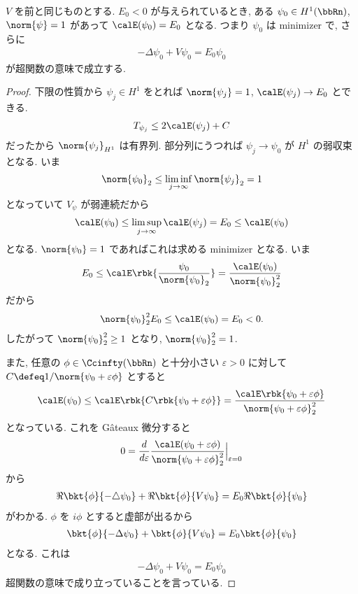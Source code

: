 \documentclass[openany, a4paper, oneside]{jsbook}
\begin{document}
\begin{thm}
$V$ を前と同じものとする.
$E_0 < 0$ が与えられているとき,
ある $\psi_0 \in H^1 (\bbRn)$, $\norm{\psi} = 1$ があって
$\calE (\psi_0) = E_0$ となる.
つまり $\psi_0$ は minimizer で, さらに
\begin{align}
 -\Delta \psi_0 + V \psi_0 = E_0 \psi_0
\end{align}
が超関数の意味で成立する.
\end{thm}
\begin{proof}
下限の性質から $\psi_j \in H^1$ をとれば
$\norm{\psi_j} = 1$, $\calE (\psi_j) \to E_0$ とできる.
\begin{align}
 T_{\psi_j}
 \leq
 2 \calE (\psi_j) + C
\end{align}
だったから $\norm{\psi_j}_{H^1}$ は有界列.
部分列にうつれば $\psi_j \to \psi_0$ が $H^1$ の弱収束となる.
いま
\begin{align}
 \norm{\psi_0}_2
 \leq
 \liminf_{j \to \infty} \norm{\psi_j}_2
 = 1
\end{align}
となっていて $V_{\psi}$ が弱連続だから
\begin{align}
 \calE (\psi_0)
 \leq
 \limsup_{j \to \infty} \calE (\psi_j)
 =
 E_0
 \leq
 \calE (\psi_0)
\end{align}
となる.
$\norm{\psi_0} = 1$ であればこれは求める minimizer となる.
いま
\begin{align}
 E_0
 \le
 \calE \rbk{\frac{\psi_0}{\norm{\psi_0}_2}}
 =
 \frac{\calE (\psi_0)}{\norm{\psi_0}_2^2}
\end{align}
だから
\begin{align}
 \norm{\psi_0}_2^2 E_0
 \leq
 \calE (\psi_0)
 = E_0
 < 0.
\end{align}
したがって $\norm{\psi_0}_2^2 \geq 1$ となり,
$\norm{\psi_0}_2^2 = 1$.

また, 任意の $\phi \in \Ccinfty (\bbRn)$ と十分小さい
$\varepsilon > 0$ に対して $C \defeq 1 / {\norm{\psi_0 + \varepsilon \phi}}$
とすると
\begin{align}
 \calE (\psi_0)
 \leq
 \calE \rbk{C \rbk{\psi_0 + \varepsilon \phi}}
 =
 \frac{\calE \rbk{\psi_0 + \varepsilon \phi}} {\norm{\psi_0 + \varepsilon \phi}_2^2}
\end{align}
となっている.
これを G\^ateaux 微分すると
\begin{align}
 0
 =
 \frac{d}{d \varepsilon} \frac{\calE (\psi_0 + \varepsilon \phi)}{\norm{\psi_0 + \varepsilon \phi}_2^2} \Bigr|_{\varepsilon = 0}
\end{align}
から
\begin{align}
 \Re \bkt{\phi}{- \triangle \psi_0} + \Re \bkt{\phi}{V\psi_0}
 =
 E_0 \Re \bkt{\phi}{\psi_0}
\end{align}
がわかる.
$\phi$ を $i \phi$ とすると虚部が出るから
\begin{align}
 \bkt{\phi}{-\Delta \psi_0} + \bkt{\phi}{V \psi_0}
 =
 E_0 \bkt{\phi}{\psi_0}
\end{align}
となる.
これは
\begin{align}
 -\Delta \psi_0 + V \psi_0
 =
 E_0 \psi_0
\end{align}
超関数の意味で成り立っていることを言っている.
\end{proof}
\end{document}
